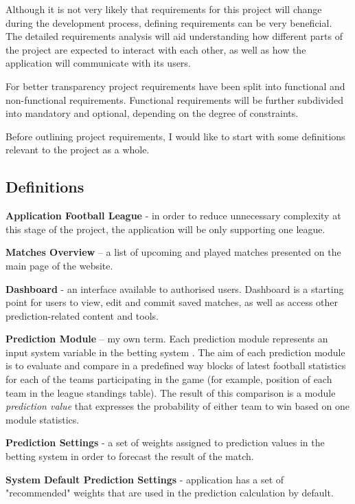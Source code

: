 Although it is not very likely that requirements for this project will change during the development process, defining requirements can be very beneficial. The detailed requirements analysis will aid understanding how different parts of the project are expected to interact with each other, as well as how the application will communicate with its users.

For better transparency project requirements have been split into functional and non-functional requirements. Functional requirements will be further subdivided into mandatory and optional, depending on the degree of constraints.

Before outlining project requirements, I would like to start with some definitions relevant to the project as a whole.

\subsection{Definitions}
\label{subsec:definitions_req}
\textbf{Application Football League} - in order to reduce unnecessary complexity at this stage of the project, the application will be only supporting one league.

\textbf{Matches Overview} – a list of upcoming and played matches presented on the main page of the website.

\textbf{Dashboard} - an interface available to authorised users. Dashboard is a starting point for users to view, edit and commit saved matches, as well as access other prediction-related content and tools.

\textbf{Prediction Module} – my own term. Each prediction module represents an input system variable in the betting system    
 \citep{art:bettingsystemvariableparameters}. The aim of each prediction module is to evaluate and compare in a predefined way blocks of latest football statistics for each of the teams participating in the game (for example, position of each team in the league standings table). The result of this comparison is a module \emph{prediction value} that expresses the probability of either team to win based on one module statistics.

\textbf{Prediction Settings} - a set of weights assigned to prediction values in the betting system in order to forecast the result of the match.

\textbf{System Default Prediction Settings} - application has a set of "recommended" weights that are used in the prediction calculation by default. 
 
